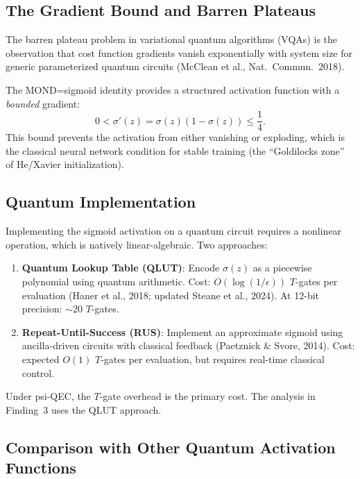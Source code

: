 \documentclass[11pt]{article}
\theoremstyle{definition}
\theoremstyle{remark}
\begin{document}
\subsection{The Gradient Bound and Barren Plateaus}
\label{sec:gradient-bound}

The barren plateau problem in variational quantum algorithms (VQAs) is
the observation that cost function gradients vanish exponentially with
system size for generic parameterized quantum circuits (McClean et al.,
Nat.\ Commun.\ 2018).

The MOND=sigmoid identity provides a structured activation function
with a \emph{bounded} gradient:
\begin{equation}
  0 < \sigma'(z) = \sigma(z)(1 - \sigma(z)) \leq \frac{1}{4}.
\end{equation}
This bound prevents the activation from either vanishing or exploding,
which is the classical neural network condition for stable training
(the ``Goldilocks zone'' of He/Xavier initialization).

\subsection{Quantum Implementation}
\label{sec:quantum-sigmoid}

Implementing the sigmoid activation on a quantum circuit requires
a nonlinear operation, which is natively linear-algebraic.  Two approaches:

\begin{enumerate}
  \item \textbf{Quantum Lookup Table (QLUT)}: Encode $\sigma(z)$ as a
    piecewise polynomial using quantum arithmetic.  Cost: $O(\log(1/\epsilon))$
    $T$-gates per evaluation (Haner et al., 2018; updated Steane et al., 2024).
    At 12-bit precision: $\sim 20$ $T$-gates.

  \item \textbf{Repeat-Until-Success (RUS)}: Implement an approximate
    sigmoid using ancilla-driven circuits with classical feedback
    (Paetznick \& Svore, 2014).  Cost: expected $O(1)$ $T$-gates per
    evaluation, but requires real-time classical control.
\end{enumerate}

Under psi-QEC, the $T$-gate overhead is the primary cost.  The analysis
in Finding~3 uses the QLUT approach.

\subsection{Comparison with Other Quantum Activation Functions}
\label{sec:activation-comparison}
\end{document}
